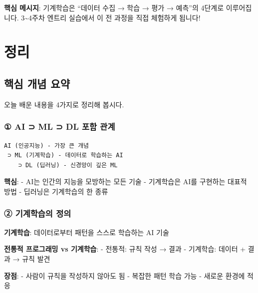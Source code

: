 \documentclass[a4paper, 11pt]{article}
\renewenvironment{quote}
  {\begin{tcolorbox}[colback=lightblue!30, colframe=mainblue!50,
   left=8pt, right=8pt, top=4pt, bottom=4pt, breakable]}
  {\end{tcolorbox}}
\begin{document}
\begin{quote}
 \textbf{핵심 메시지}: 기계학습은 ``데이터 수집 → 학습 → 평가 →
예측''의 4단계로 이루어집니다. 3\textasciitilde4주차 엔트리 실습에서 이
전 과정을 직접 체험하게 됩니다!
\end{quote}

\hypertarget{uxc815uxb9ac}{%
\section{ 정리}\label{uxc815uxb9ac}}

\hypertarget{uxd575uxc2ec-uxac1cuxb150-uxc694uxc57d}{%
\subsection{핵심 개념
요약}\label{uxd575uxc2ec-uxac1cuxb150-uxc694uxc57d}}

오늘 배운 내용을 4가지로 정리해 봅시다.

\hypertarget{ai-ml-dl-uxd3ecuxd568-uxad00uxacc4}{%
\subsubsection{\textbf{①} AI ⊃ ML ⊃ DL 포함
관계}\label{ai-ml-dl-uxd3ecuxd568-uxad00uxacc4}}

\begin{verbatim}
AI (인공지능) - 가장 큰 개념
 ⊃ ML (기계학습) - 데이터로 학습하는 AI
    ⊃ DL (딥러닝) - 신경망이 깊은 ML
\end{verbatim}

\textbf{핵심}: - AI는 인간의 지능을 모방하는 모든 기술 - 기계학습은 AI를
구현하는 대표적 방법 - 딥러닝은 기계학습의 한 종류

\hypertarget{uxae30uxacc4uxd559uxc2b5uxc758-uxc815uxc758}{%
\subsubsection{\textbf{②} 기계학습의
정의}\label{uxae30uxacc4uxd559uxc2b5uxc758-uxc815uxc758}}

\begin{quote}
\textbf{기계학습}: 데이터로부터 패턴을 스스로 학습하는 AI 기술
\end{quote}

\textbf{전통적 프로그래밍 vs 기계학습}: - 전통적: 규칙 작성 → 결과 -
기계학습: 데이터 + 결과 → 규칙 발견

\textbf{장점}: - 사람이 규칙을 작성하지 않아도 됨 - 복잡한 패턴 학습
가능 - 새로운 환경에 적응
\end{document}
